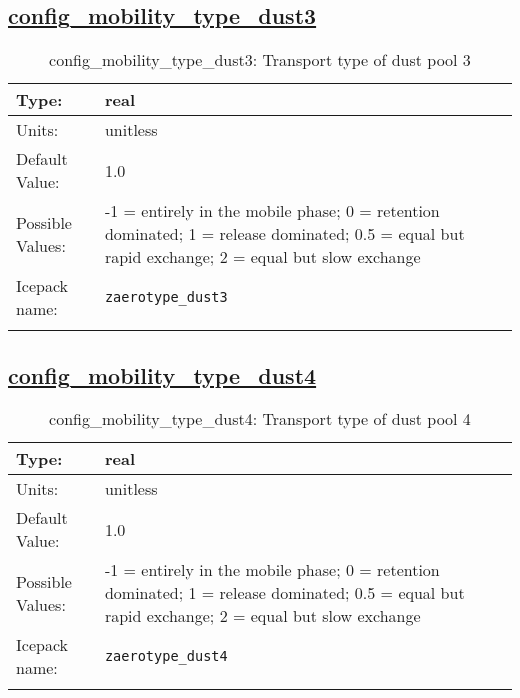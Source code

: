 \subsection[config\_mobility\_type\_dust3]{\hyperref[sec:nm_tab_biogeochemistry]{config\_mobility\_type\_dust3}}
\label{subsec:nm_sec_config_mobility_type_dust3}
\begin{center}
\begin{longtable}{| p{2.0in} || p{4.0in} |}
    \hline
    Type: & real \\
    \hline
    Units: & \si{unitless} \\
    \hline
    Default Value: & 1.0 \\
    \hline
    Possible Values: & -1 = entirely in the mobile phase; 0 = retention dominated; 1 = release dominated; 0.5 = equal but rapid exchange; 2 = equal but slow exchange \\
    \hline
    \hline
    Icepack name: & \verb+zaerotype_dust3+ \\
    \caption{config\_mobility\_type\_dust3: Transport type of dust pool 3}
\end{longtable}
\end{center}
\subsection[config\_mobility\_type\_dust4]{\hyperref[sec:nm_tab_biogeochemistry]{config\_mobility\_type\_dust4}}
\label{subsec:nm_sec_config_mobility_type_dust4}
\begin{center}
\begin{longtable}{| p{2.0in} || p{4.0in} |}
    \hline
    Type: & real \\
    \hline
    Units: & \si{unitless} \\
    \hline
    Default Value: & 1.0 \\
    \hline
    Possible Values: & -1 = entirely in the mobile phase; 0 = retention dominated; 1 = release dominated; 0.5 = equal but rapid exchange; 2 = equal but slow exchange \\
    \hline
    \hline
    Icepack name: & \verb+zaerotype_dust4+ \\
    \caption{config\_mobility\_type\_dust4: Transport type of dust pool 4}
\end{longtable}
\end{center}
